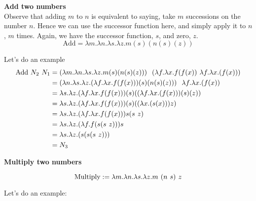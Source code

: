 \documentclass{article}
\begin{document}
\begin{enumerate}
    \Large \textbf{Add two numbers}\\
    \normalsize
    Observe that adding \(m\) to \(n\) is equivalent to saying, take \(m\) successions on the number \(n\). Hence we can use the successor function here, and simply apply it to \(n\), \(m\) times. Again, we have the successor function, \(s\), and zero, \(z\).\\
    
    \[\text{Add} = \lambda m.\lambda n.\lambda s.\lambda z.m (s) (n (s) (z))\]

    Let's do an example
    \begin{align}
        \text{Add } N_2 \hspace{0.125cm} N_1
        &= (\lambda m.\lambda n.\lambda s.\lambda z.m (s) (n (s) (z))) \hspace{0.25cm} (\lambda f.\lambda x.f(f(x)) \hspace{0.125cm} \lambda f.\lambda x.(f(x))) \\
        &= (\lambda n.\lambda s.\lambda z.(\lambda f.\lambda x.f(f(x))) (s) (n (s) (z)))      \hspace{0.25cm} \lambda f.\lambda x.(f(x)) \\
        &= \lambda s.\lambda z.(\lambda f.\lambda x.f(f(x))) (s) ((\lambda f.\lambda x.(f(x))) (s) (z)) \\
        &= \lambda s.\lambda z.(\lambda f.\lambda x.f(f(x))) (s) ((\lambda x.(s(x))) z) \\
        &= \lambda s.\lambda z.(\lambda f.\lambda x.f(f(x))) s (s \hspace{0.125cm} z) \\
        &= \lambda s.\lambda z.(\lambda f.f(s(s \hspace{0.125cm} z))) s \\
        &= \lambda s.\lambda z.(s(s(s \hspace{0.125cm} z))) \\
        &= N_3
    \end{align}

    \Large \textbf{Multiply two numbers}\\
    \normalsize

    \[\text{Multiply} := \lambda m.\lambda n.\lambda s.\lambda z.m \hspace{0.125cm} (n \hspace{0.125cm} s) \hspace{0.125cm} z\]

    Let's do an example:


\end{enumerate}
\end{document}

